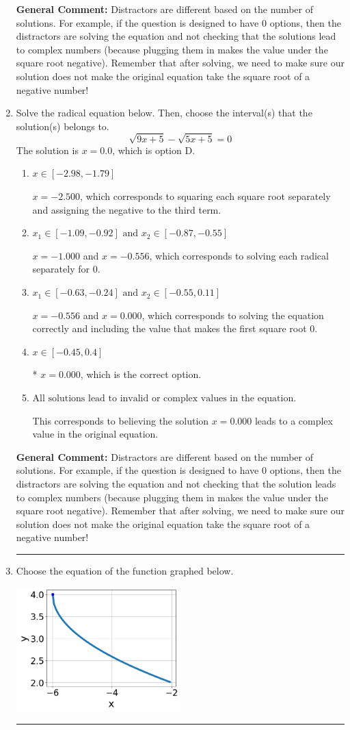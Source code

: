\documentclass{extbook}[14pt]
\newcommand{\litem}[1]{\item #1

\rule{\textwidth}{0.4pt}}
\begin{document}
\begin{enumerate}
{\textbf{General Comment:} Distractors are different based on the number of solutions. For example, if the question is designed to have 0 options, then the distractors are solving the equation and not checking that the solutions lead to complex numbers (because plugging them in makes the value under the square root negative). Remember that after solving, we need to make sure our solution does not make the original equation take the square root of a negative number!
}
\litem{
Solve the radical equation below. Then, choose the interval(s) that the solution(s) belongs to.
\[ \sqrt{9 x + 5} - \sqrt{5 x + 5} = 0 \]The solution is \( x = 0.0 \), which is option D.\begin{enumerate}[label=\Alph*.]
\item \( x \in [-2.98,-1.79] \)

$x = -2.500$, which corresponds to squaring each square root separately and assigning the negative to the third term.
\item \( x_1 \in [-1.09, -0.92] \text{ and } x_2 \in [-0.87,-0.55] \)

$x = -1.000$ and $x = -0.556$, which corresponds to solving each radical separately for 0.
\item \( x_1 \in [-0.63, -0.24] \text{ and } x_2 \in [-0.55,0.11] \)

$x = -0.556$ and $x = 0.000$, which corresponds to solving the equation correctly and including the value that makes the first square root 0.
\item \( x \in [-0.45,0.4] \)

* $x = 0.000$, which is the correct option.
\item \( \text{All solutions lead to invalid or complex values in the equation.} \)

This corresponds to believing the solution $x = 0.000$ leads to a complex value in the original equation.
\end{enumerate}

\textbf{General Comment:} Distractors are different based on the number of solutions. For example, if the question is designed to have 0 options, then the distractors are solving the equation and not checking that the solution leads to complex numbers (because plugging them in makes the value under the square root negative). Remember that after solving, we need to make sure our solution does not make the original equation take the square root of a negative number!
}
\litem{
Choose the equation of the function graphed below.

\begin{center}
    \includegraphics[width=0.5\textwidth]{../Figures/radicalGraphToEquationCopyA.png}
\end{center}


}
\end{enumerate}
\end{document}
